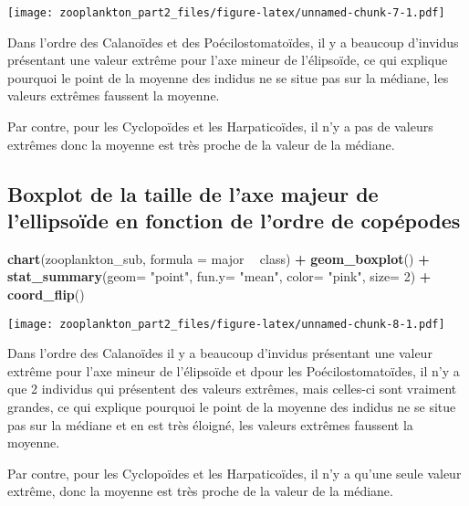 \documentclass[]{article}
\newenvironment{Shaded}{\begin{snugshade}}{\end{snugshade}}
\newcommand{\KeywordTok}[1]{\textcolor[rgb]{0.13,0.29,0.53}{\textbf{#1}}}
\newcommand{\DataTypeTok}[1]{\textcolor[rgb]{0.13,0.29,0.53}{#1}}
\newcommand{\DecValTok}[1]{\textcolor[rgb]{0.00,0.00,0.81}{#1}}
\newcommand{\StringTok}[1]{\textcolor[rgb]{0.31,0.60,0.02}{#1}}
\newcommand{\OperatorTok}[1]{\textcolor[rgb]{0.81,0.36,0.00}{\textbf{#1}}}
\newcommand{\NormalTok}[1]{#1}
\begin{document}
\texttt{[image: zooplankton\_part2\_files/figure-latex/unnamed-chunk-7-1.pdf]}

Dans l'ordre des Calanoïdes et des Poécilostomatoïdes, il y a beaucoup
d'invidus présentant une valeur extrême pour l'axe mineur de
l'élipsoïde, ce qui explique pourquoi le point de la moyenne des indidus
ne se situe pas sur la médiane, les valeurs extrêmes faussent la
moyenne.

Par contre, pour les Cyclopoïdes et les Harpaticoïdes, il n'y a pas de
valeurs extrêmes donc la moyenne est très proche de la valeur de la
médiane.

\subsection{Boxplot de la taille de l'axe majeur de l'ellipsoïde en
fonction de l'ordre de
copépodes}\label{boxplot-de-la-taille-de-laxe-majeur-de-lellipsoide-en-fonction-de-lordre-de-copepodes}

\begin{Shaded}
\begin{Highlighting}[]
\KeywordTok{chart}\NormalTok{(zooplankton_sub, }\DataTypeTok{formula =}\NormalTok{ major }\OperatorTok{~}\StringTok{ }\NormalTok{class) }\OperatorTok{+}\StringTok{ }
\StringTok{  }\KeywordTok{geom_boxplot}\NormalTok{() }\OperatorTok{+}
\StringTok{  }\KeywordTok{stat_summary}\NormalTok{(}\DataTypeTok{geom=} \StringTok{"point"}\NormalTok{, }\DataTypeTok{fun.y=} \StringTok{"mean"}\NormalTok{, }\DataTypeTok{color=} \StringTok{"pink"}\NormalTok{, }\DataTypeTok{size=} \DecValTok{2}\NormalTok{) }\OperatorTok{+}
\StringTok{  }\KeywordTok{coord_flip}\NormalTok{() }
\end{Highlighting}
\end{Shaded}

\texttt{[image: zooplankton\_part2\_files/figure-latex/unnamed-chunk-8-1.pdf]}

Dans l'ordre des Calanoïdes il y a beaucoup d'invidus présentant une
valeur extrême pour l'axe mineur de l'élipsoïde et dpour les
Poécilostomatoïdes, il n'y a que 2 individus qui présentent des valeurs
extrêmes, mais celles-ci sont vraiment grandes, ce qui explique pourquoi
le point de la moyenne des indidus ne se situe pas sur la médiane et en
est très éloigné, les valeurs extrêmes faussent la moyenne.

Par contre, pour les Cyclopoïdes et les Harpaticoïdes, il n'y a qu'une
seule valeur extrême, donc la moyenne est très proche de la valeur de la
médiane.
\end{document}
